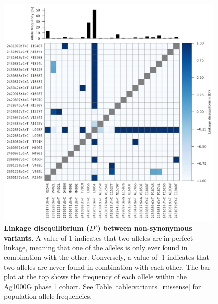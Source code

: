 \documentclass[a4paper,11pt,abstracton,hidelinks]{scrartcl}
\begin{document}
%
\begin{figure}[!t]

  \centering

  \includegraphics[width=\linewidth]{artwork/fig_ld.png}

  \caption{\textbf{Linkage disequilibrium ($D'$) between non-synonymous variants}. A value of 1 indicates that two alleles are in perfect linkage, meaning that one of the alleles is only ever found in combination with the other. Conversely, a value of -1 indicates that two alleles are never found in combination with each other. The bar plot at the top shows the frequency of each allele within the Ag1000G phase 1 cohort. See Table \ref{table:variants_missense} for population allele frequencies.}

  \label{fig:ld}

\end{figure}
\end{document}
